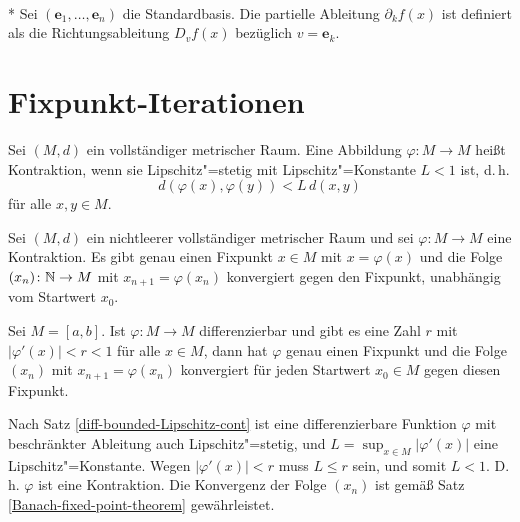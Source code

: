\begin{Definition}\mbox{}\\*
Sei $(\mathbf e_1,\ldots,\mathbf e_n)$ die Standardbasis. 
Die partielle Ableitung $\partial_k f(x)$ ist definiert als
die Richtungsableitung $D_v f(x)$ bezüglich $v=\mathbf e_k$.
\end{Definition}

\newpage
\section{Fixpunkt-Iterationen}%

\begin{Definition}[Kontraktion]
Sei $(M,d)$ ein vollständiger metrischer Raum. Eine Abbildung
$\varphi\colon M\to M$ heißt Kontraktion, wenn sie
Lipschitz"=stetig mit Lipschitz"=Konstante $L<1$ ist, d.\,h.
\[d(\varphi(x),\varphi(y))<L\,d(x,y)\]
für alle $x,y\in M$.
\end{Definition}

\begin{Satz}\label{Banach-fixed-point-theorem}%
Sei $(M,d)$ ein nichtleerer vollständiger metrischer Raum
und sei $\varphi\colon M\to M$ eine Kontraktion. Es gibt genau
einen Fixpunkt $x\in M$ mit $x=\varphi(x)$ und die Folge
$(x_n)\colon\mathbb N\to M$ mit $x_{n+1}=\varphi(x_n)$ konvergiert
gegen den Fixpunkt, unabhängig vom Startwert $x_0$.
\end{Satz}

\begin{Satz}\label{diff-fixed-point-iter}
Sei $M=[a,b]$. Ist $\varphi\colon M\to M$ differenzierbar und gibt es
eine Zahl $r$ mit $|\varphi'(x)|<r<1$ für alle $x\in M$, dann
hat $\varphi$ genau einen Fixpunkt und die Folge $(x_n)$ mit $x_{n+1}=\varphi(x_n)$
konvergiert für jeden Startwert $x_0\in M$ gegen diesen Fixpunkt.
\end{Satz}
\begin{Beweis}
Nach Satz \ref{diff-bounded-Lipschitz-cont} ist eine differenzierbare
Funktion $\varphi$ mit beschränkter Ableitung auch Lipschitz"=stetig,
und $L=\sup_{x\in M}|\varphi'(x)|$ eine Lipschitz"=Konstante.
Wegen $|\varphi'(x)|<r$ muss $L\le r$ sein, und somit $L<1$.
D.\,h. $\varphi$ ist eine Kontraktion. Die Konvergenz der Folge
$(x_n)$ ist gemäß Satz \ref{Banach-fixed-point-theorem}
gewährleistet.\;\qedsymbol
\end{Beweis}

